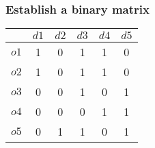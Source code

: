\subsubsection{Establish a binary matrix}
\begin{center}
\begin{tabular}{|*{6}{c|}}
\hline & \(d1\) & \(d2\) & \(d3\) & \(d4\) & \(d5\) \\
\hline \(o1\) & 1 & 0 & 1 & 1 & 0 \\
\hline \(o2\) & 1 & 0 & 1 & 1 & 0 \\
\hline \(o3\) & 0 & 0 & 1 & 0 & 1 \\
\hline \(o4\) & 0 & 0 & 0 & 1 & 1 \\
\hline \(o5\) & 0 & 1 & 1 & 0 & 1 \\
\hline
\end{tabular}
\end{center}
